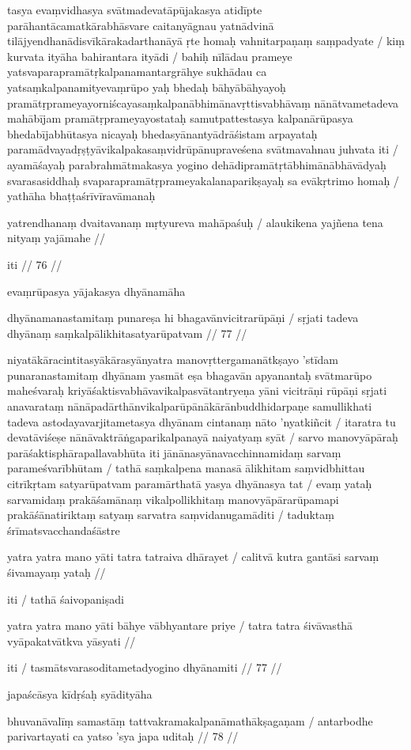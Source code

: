 tasya evaṃvidhasya svātmadevatāpūjakasya atidīpte parāhantācamatkārabhāsvare caitanyāgnau yatnādvinā tilājyendhanādisvīkārakadarthanāyā ṛte homaḥ vahnitarpaṇaṃ saṃpadyate  / kiṃ kurvata ityāha bahirantara ityādi  / bahiḥ nīlādau prameye yatsvaparapramātṛkalpanamantargrāhye sukhādau ca yatsaṃkalpanamityevaṃrūpo yaḥ bhedaḥ bāhyābāhyayoḥ pramātṛprameyayorniścayasaṃkalpanābhimānavṛttisvabhāvaṃ nānātvametadeva mahābījam pramātṛprameyayostataḥ samutpattestasya kalpanārūpasya bhedabījabhūtasya nicayaḥ bhedasyānantyādrāśistam arpayataḥ paramādvayadṛṣṭyāvikalpakasaṃvidrūpānupraveśena svātmavahnau juhvata iti  / ayamāśayaḥ parabrahmātmakasya yogino dehādipramātṛtābhimānābhāvādyaḥ svarasasiddhaḥ svaparapramātṛprameyakalanaparikṣayaḥ sa evākṛtrimo homaḥ  / yathāha bhaṭṭaśrīvīravāmanaḥ

yatrendhanaṃ dvaitavanaṃ mṛtyureva mahāpaśuḥ  /
alaukikena yajñena tena nityaṃ yajāmahe  //

iti  // 76  //

evaṃrūpasya yājakasya dhyānamāha

dhyānamanastamitaṃ punareṣa hi bhagavānvicitrarūpāṇi  /
sṛjati tadeva dhyānaṃ saṃkalpālikhitasatyarūpatvam  // 77  //

niyatākāracintitasyākārasyānyatra manovṛttergamanātkṣayo 'stīdam punaranastamitaṃ dhyānam yasmāt eṣa bhagavān apyanantaḥ svātmarūpo maheśvaraḥ kriyāśaktisvabhāvavikalpasvātantryeṇa yāni vicitrāṇi rūpāṇi sṛjati anavarataṃ nānāpadārthānvikalparūpānākārānbuddhidarpaṇe samullikhati tadeva astodayavarjitametasya dhyānam cintanaṃ nāto 'nyatkiñcit  / itaratra tu devatāviśeṣe nānāvaktrāṅgaparikalpanayā naiyatyaṃ syāt  / sarvo manovyāpāraḥ parāśaktisphārapallavabhūta iti jānānasyānavacchinnamidaṃ sarvaṃ parameśvarībhūtam  / tathā saṃkalpena manasā ālikhitam saṃvidbhittau citrīkṛtam satyarūpatvam paramārthatā yasya dhyānasya tat  / evaṃ yataḥ sarvamidaṃ prakāśamānaṃ vikalpollikhitaṃ manovyāpārarūpamapi prakāśānatiriktaṃ satyaṃ sarvatra saṃvidanugamāditi  / taduktaṃ śrīmatsvacchandaśāstre

yatra yatra mano yāti tatra tatraiva dhārayet  /
calitvā kutra gantāsi sarvaṃ śivamayaṃ yataḥ  //

iti  / tathā śaivopaniṣadi

yatra yatra mano yāti bāhye vābhyantare priye  /
tatra tatra śivāvasthā vyāpakatvātkva yāsyati  //

iti  / tasmātsvarasoditametadyogino dhyānamiti  // 77  //

japaścāsya kīdṛśaḥ syādityāha

bhuvanāvalīṃ samastāṃ tattvakramakalpanāmathākṣagaṇam  /
antarbodhe parivartayati ca yatso 'sya japa uditaḥ  // 78  //

